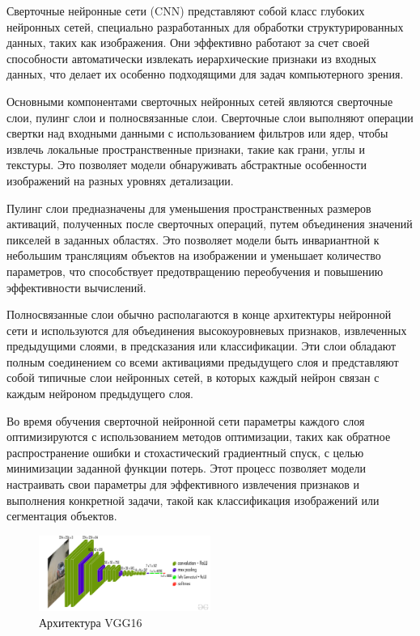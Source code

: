 Сверточные нейронные сети (CNN)\cite{lecun1989handwritten} представляют собой класс глубоких нейронных сетей, специально разработанных для обработки структурированных данных, таких как изображения. Они эффективно работают за счет своей способности автоматически извлекать иерархические признаки из входных данных, что делает их особенно подходящими для задач компьютерного зрения.

Основными компонентами сверточных нейронных сетей являются сверточные слои, пулинг слои и полносвязанные слои. Сверточные слои выполняют операции свертки над входными данными с использованием фильтров или ядер, чтобы извлечь локальные пространственные признаки, такие как грани, углы и текстуры. Это позволяет модели обнаруживать абстрактные особенности изображений на разных уровнях детализации.

Пулинг слои предназначены для уменьшения пространственных размеров активаций, полученных после сверточных операций, путем объединения значений пикселей в заданных областях. Это позволяет модели быть инвариантной к небольшим трансляциям объектов на изображении и уменьшает количество параметров, что способствует предотвращению переобучения и повышению эффективности вычислений.

Полносвязанные слои обычно располагаются в конце архитектуры нейронной сети и используются для объединения высокоуровневых признаков, извлеченных предыдущими слоями, в предсказания или классификации. Эти слои обладают полным соединением со всеми активациями предыдущего слоя и представляют собой типичные слои нейронных сетей, в которых каждый нейрон связан с каждым нейроном предыдущего слоя.

Во время обучения сверточной нейронной сети параметры каждого слоя оптимизируются с использованием методов оптимизации, таких как обратное распространение ошибки и стохастический градиентный спуск, с целью минимизации заданной функции потерь. Этот процесс позволяет модели настраивать свои параметры для эффективного извлечения признаков и выполнения конкретной задачи, такой как классификация изображений или сегментация объектов.


\begin{figure}[h]
    \centering
    \includegraphics[width=0.5\textwidth]{assets/cv/vgg16.jpg}
    \caption{Архитектура VGG16 \cite{simonyan2014very}}
    \label{vgg_arch}
\end{figure}


